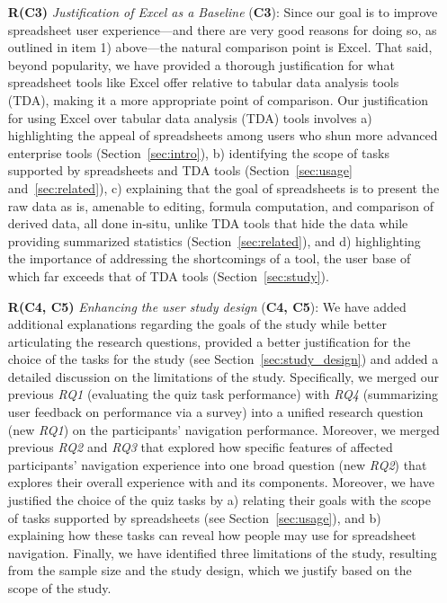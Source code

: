 \begin{itemize}
\item[\textbf{R(C3)}] \textit{Justification of Excel as a Baseline} (\textbf{C3}):
Since our goal is to improve spreadsheet
user experience---and there are very good reasons for doing so,
as outlined in item 1) above---the natural comparison point
is Excel. 
That said, beyond popularity, 
we have provided a thorough justification
for what spreadsheet tools like Excel offer
relative to tabular data analysis tools (TDA),
making it a more appropriate point of comparison.
Our justification for using Excel over 
tabular data analysis (TDA) tools involves 
a) highlighting the appeal of spreadsheets 
among users who shun more advanced enterprise 
tools (Section~\ref{sec:intro}), 
b) identifying the scope of tasks 
supported by spreadsheets and 
TDA tools (Section~\ref{sec:usage} and~\ref{sec:related}), 
c) explaining that the goal of spreadsheets 
is to present the raw data as is, 
amenable to editing, formula computation, 
and comparison of derived data, all done in-situ,
unlike TDA tools that hide the data 
while providing summarized statistics 
(Section~\ref{sec:related}), and 
d) highlighting the importance of 
addressing the shortcomings of a tool, 
the user base of which far exceeds 
that of TDA tools (Section~\ref{sec:study}). 


\item[\textbf{R(C4, C5)}] \textit{Enhancing the user study design} 
(\textbf{C4, C5}):
We have added additional 
explanations regarding the goals 
of the study while better articulating 
the research questions, 
provided a better justification 
for the choice of the tasks for the study (see Section~\ref{sec:study_design}) 
and added a detailed discussion on the limitations of the study. 
Specifically, we merged our previous \emph{RQ1} (evaluating the quiz task performance) 
with \emph{RQ4} (summarizing user feedback on performance via a survey) 
into a unified research question (new \emph{RQ1}) 
on the participants' navigation performance. 
Moreover, we merged previous \emph{RQ2} and \emph{RQ3} 
that explored how specific features of \noah 
affected participants' navigation experience 
into one broad question (new \emph{RQ2}) 
that explores their overall experience with \noah and its components. 
Moreover, we have justified the choice of the quiz tasks by 
a) relating their goals with the scope of tasks supported by spreadsheets (see Section~\ref{sec:usage}), 
and b) explaining how these tasks can reveal how people may use \noah 
for spreadsheet navigation. 
Finally, we have identified three limitations of the study, 
resulting from the sample size and the study design, which we justify based on the scope of the study.


\end{itemize}

